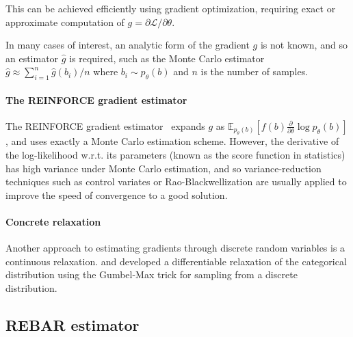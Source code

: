 \documentclass{article}
\newcommand{\discreteDist}{p_{\theta}(b)}
\newcommand{\loss}{f(b)}
\newcommand{\lossGrad}{\loss{} \frac{\partial}{\partial \theta }\log \discreteDist{}}
\newcommand{\mcGrad}{\hat{g}}
\newcommand{\expectedLossLogTrick}{\mathbb{E}_{\discreteDist{}} \left[ \lossGrad{} \right]}
\begin{document}
This can be achieved efficiently using gradient optimization, requiring exact or approximate computation of $g=\partial\mathcal{L} / {\partial \theta}$.

In many cases of interest, an analytic form of the gradient $g$ is not known, and so an estimator $\mcGrad{}$ is required, such as the Monte Carlo estimator $\mcGrad{}\approx \sum_{i=1}^n\hat{g}(b_i) / n$ where $b_i\sim \discreteDist{}$ and $n$ is the number of samples. 


\paragraph{The REINFORCE gradient estimator}
The REINFORCE gradient estimator~\citep{williams1992simple} expands $g$ as $\expectedLossLogTrick{}$, and uses exactly a Monte Carlo estimation scheme. 
However, the derivative of the log-likelihood w.r.t. its parameters (known as the score function in statistics) has high variance under Monte Carlo estimation, and so variance-reduction techniques such as control variates or Rao-Blackwellization are usually applied to improve the speed of convergence to a good solution.

\paragraph{Concrete relaxation}
Another approach to estimating gradients through discrete random variables is a continuous relaxation. 
\cite{maddison2016concrete} and \cite{jang2016categorical} developed a differentiable relaxation of the categorical distribution using the Gumbel-Max trick for sampling from a discrete distribution.





\subsection{REBAR estimator}
\end{document}
